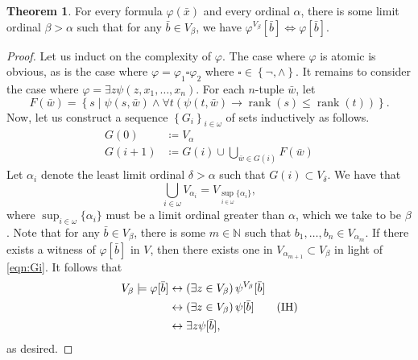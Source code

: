 \documentclass[10pt,letterpaper,cm]{nupset}
\theoremstyle{definition}
\theoremstyle{theorem}
\newtheorem{theorem}[definition]{Theorem}
\theoremstyle{remark}
\newcommand{\N}{\mathbb N}
\newcommand{\1}{\mathbf{1}}
\newcommand{\0}{\vec 0}
\DeclareMathOperator{\rnk}{rank}
\begin{document}
\begin{theorem}\label{RP'}
For every formula $\varphi(\bar{x})$ and every ordinal $\alpha$, there is some limit ordinal $\beta > \alpha$ such that for any $\bar{b} \in V_{\beta}$, we have $\varphi^{V_{\beta}}[\bar{b}] \iff \varphi[\bar{b}]$.
\end{theorem}
\begin{proof}
Let us induct on the complexity of $\varphi$. The case where $\varphi$ is atomic is obvious, as is the case where $\varphi   = \varphi_1 \square \varphi_2$ where $\square \in \left\{\neg, \land\right\}$.   It remains to consider the case where $\varphi = \exists{z}\psi(z, x_1, \ldots, x_n)$. For each $n$-tuple $\bar{w}$, let 
\[
F(\bar{w}) =\left\{s\mid \psi(s, \bar{w}) \land \forall{t}(\psi(t, \bar{w}) \rightarrow \rnk(s) \leq \rnk(t))\right\}
.\] Now, let us construct a sequence $\left\{G_i\right\}_{i\in \omega}$ of sets inductively as follows.
\begin{align*}
G(0) & \coloneqq V_{\alpha}
\\  \label{eqn:Gi} G(i+1) & \coloneqq   G(i) \cup \bigcup_{\bar{w} \in G(i)}F(\bar{w}) \tag{$\ast$}
\end{align*}
Let $\alpha_i$ denote the least limit ordinal $\delta>\alpha $ such that $G(i) \subset V_{\delta}$. We have that
\[
\bigcup_{i\in \omega}V_{\alpha_i} = V_{\sup_{i \in \omega}\{\alpha_i\}},
\]
where $\sup_{i \in \omega}\{\alpha_i\}$ must be a limit ordinal greater than $\alpha$, which we take to be $\beta$. Note that for any $\bar{b}\in V_{\beta}$, there is some $m\in \N$ such that $b_1, \ldots, b_n \in V_{\alpha_m}$. If there exists a witness of $\varphi[\bar{b}]$ in $V$, then there exists one in $V_{\alpha_{m+1}}\subset V_{\beta}$ in light of \eqref{eqn:Gi}.  It follows that
\begin{align*}
V_{\beta} \models \varphi[\bar{b}] & \leftrightarrow \left(\exists{z\in V_{\beta}}\right)\psi^{V_{\beta}}[\bar{b}]
\\ & \leftrightarrow  \left(\exists{z\in V_{\beta}}\right)\psi[\bar{b}] \tag{\text{IH}}
\\ & \leftrightarrow  \exists{z}\psi[\bar{b}]
,
\end{align*} as desired.

\end{proof}
\end{document}
